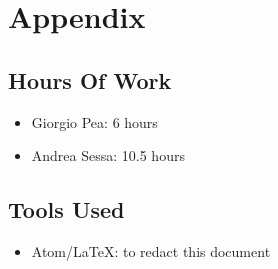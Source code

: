 \documentclass[11pt,titlepage]{article} %
\begin{document}
\newpage
\section{Appendix}
  \subsection{Hours Of Work}
    \begin{itemize}
     \item Giorgio Pea: 6 hours
     \item Andrea Sessa: 10.5 hours
    \end{itemize}

  \subsection{Tools Used}
    \begin{itemize}
     \item  Atom/\LaTeX: to redact this document
    \end{itemize}
\end{document}
